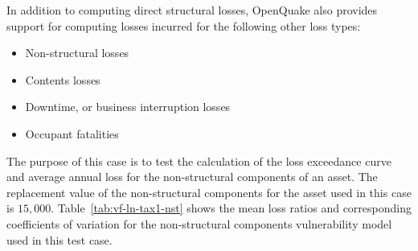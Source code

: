 In addition to computing direct structural losses, OpenQuake also provides support for computing losses incurred for the following other loss types:

\begin{itemize}
\item{Non-structural losses}
\item{Contents losses}
\item{Downtime, or business interruption losses}
\item{Occupant fatalities}
\end{itemize}

The purpose of this case is to test the calculation of the loss exceedance curve and average annual loss for the non-structural components of an asset. The replacement value of the non-structural components for the asset used in this case is $15,000$. Table~\ref{tab:vf-ln-tax1-nst} shows the mean loss ratios and corresponding coefficients of variation for the non-structural components vulnerability model used in this test case.
